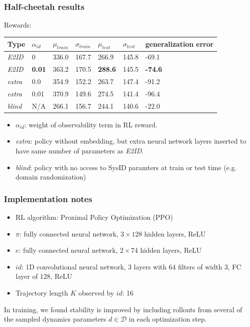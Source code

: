 \documentclass{beamer}
\newcommand{\cD}{\mathcal{D}}
\newcommand{\blind}{\emph{blind}}
\newcommand{\extra}{\emph{extra}}
\newcommand{\embed}{\emph{E2ID}}
\newcommand{\embedfn}{e}
\newcommand{\idfn}{{id}}
\begin{document}
\begin{frame}
\frametitle{Half-cheetah results}

\centering
Rewards:

\vspace{0.3cm}

\begin{tabular}{l l l l l l l}
Type & $\alpha_{id}$ & $\mu_{train}$ & $\sigma_{train}$& $\mu_{test}$ & $\sigma_{test}$ & generalization error \\
\hline
\embed{} & 0 & 336.0 & 167.7 & 266.9 & 145.8 & -69.1 \\
\embed{} & \textbf{0.01} & 363.2 & 170.5 & \textbf{288.6} & 145.5 & \textbf{-74.6} \\
\extra{} & 0.0 & 354.9 & 152.2  & 263.7 & 147.4 & -91.2 \\
\extra{} & 0.01 & 370.9 & 149.6 & 274.5 & 141.4 & -96.4 \\
\blind{} & N/A & 266.1 & 156.7 & 244.1 & 140.6 & -22.0
\end{tabular}

\vspace{0.5cm}

\begin{itemize}
\item $\alpha_{id}$: weight of observability term in RL reward.
\item \extra{}: policy without embedding, but extra neural network layers inserted to have same number of parameters as \embed{}.
\item \blind{}: policy with no access to SysID paramters at train or test time (e.g. domain randomization)
\end{itemize}
\end{frame}

\begin{frame}
\frametitle{Implementation notes}
\begin{itemize}
\item RL algorithm: Proximal Policy Optimization (PPO)
\item $\pi$: fully connected neural network, $3 \times 128$ hidden layers, ReLU
\item $\embedfn$: fully connected neural network, $2 \times 74$ hidden layers, ReLU
\item $\idfn$: 1D convolutional neural network, $3$ layers with $64$ filters of width $3$, FC layer of $128$, ReLU
\item Trajectory length $K$ observed by $\idfn$: 16
\end{itemize}

In training, we found stability is improved by including rollouts from several of the sampled dynamics parameters $d \in \cD$ in each optimization step.
\end{frame}
\end{document}
